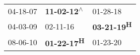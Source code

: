 \begin{supertabular}{lll}
 04-18-07\textsuperscript{} &  \textbf{11-02-12\textsuperscript{$\wedge$}} &            01-28-18\textsuperscript{} \\
 04-03-09\textsuperscript{} &                   02-11-16\textsuperscript{} &  \textbf{03-21-19\textsuperscript{H}} \\
 08-06-10\textsuperscript{} &         \textbf{01-22-17\textsuperscript{H}} &            01-23-20\textsuperscript{} \\
\end{supertabular}
